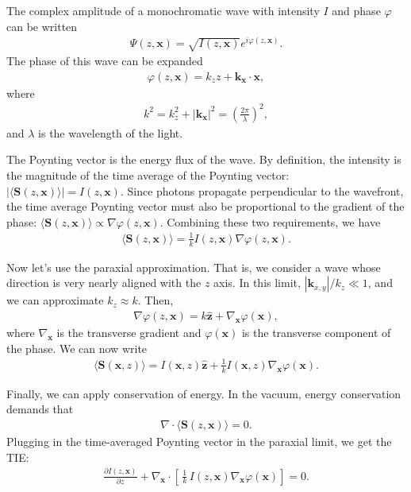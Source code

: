 \documentclass[TS,authoryear,toc]{lsstdoc}
\begin{document}
The complex amplitude of a monochromatic wave with intensity $I$ and phase $\varphi$ can be written
\begin{align}
    \Psi(z, \mathbf{x}) = \sqrt{I(z, \mathbf{x})} e^{i\varphi(z, \mathbf{x})}.
\end{align}
The phase of this wave can be expanded
\begin{align}
    \varphi(z, \mathbf{x}) = k_z z + \mathbf{k}_\mathbf{x} \cdot \mathbf{x},
\end{align}
where
\begin{align}
    k^2 = k_z^2 + |\mathbf{k}_\mathbf{x}|^2  = \left(\frac{2\pi}{\lambda}\right)^2,
\end{align}
and $\lambda$ is the wavelength of the light.

The Poynting vector is the energy flux of the wave.
By definition, the intensity is the magnitude of the time average of the Poynting vector: $|\langle \mathbf{S}(z, \mathbf{x}) \rangle| = I(z, \mathbf{x})$.
Since photons propagate perpendicular to the wavefront, the time average Poynting vector must also be proportional to the gradient of the phase: $\langle \mathbf{S}(z, \mathbf{x}) \rangle \propto \nabla \varphi(z, \mathbf{x})$.
Combining these two requirements, we have
\begin{align}
    \langle \mathbf{S}(z, \mathbf{x}) \rangle = \frac{1}{k} I(z, \mathbf{x}) \nabla \varphi(z, \mathbf{x}).
\end{align}

Now let's use the paraxial approximation.
That is, we consider a wave whose direction is very nearly aligned with the $z$ axis.
In this limit, $|\mathbf{k}_{x,y}| / k_z \ll 1$, and we can approximate $k_z \approx k$.
Then,
\begin{align}
    \nabla \varphi(z, \mathbf{x}) = k \hat{\mathbf{z}} + \nabla_\mathbf{x} \varphi(\mathbf{x}),
\end{align}
where $\nabla_\mathbf{x}$ is the transverse gradient and $\varphi(\mathbf{x})$ is the transverse component of the phase.
We can now write
\begin{align}
    \langle \mathbf{S}(\mathbf{x}, z) \rangle = 
    I(\mathbf{x}, z) \hat{\mathbf{z}} + \frac{1}{k} I(\mathbf{x}, z) \nabla_\mathbf{x} \varphi(\mathbf{x}).
\end{align}

Finally, we can apply conservation of energy.
In the vacuum, energy conservation demands that
\begin{align}
    \nabla \cdot \langle \mathbf{S}(z, \mathbf{x}) \rangle = 0.
\end{align}
Plugging in the time-averaged Poynting vector in the paraxial limit, we get the TIE:
\begin{align}
    \frac{\partial I(z, \mathbf{x})}{\partial z} + \nabla_\mathbf{x} \cdot \left[\,\frac{1}{k} \, I(z, \mathbf{x}) \nabla_\mathbf{x} \varphi(\mathbf{x})\right] = 0.
    \label{eq:tie-full}
\end{align}
\end{document}
